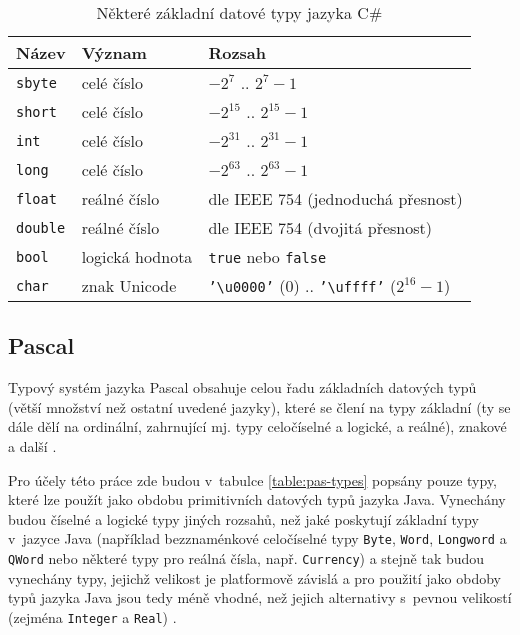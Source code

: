 \documentclass[onepage, a4paper, 12pt]{bakalarka}
\begin{document}
\begin{table}\centering
\caption{Některé základní datové typy jazyka C\#}
\begin{tabular}{| l | l | l |}
\hline
\textbf{Název} & \textbf{Význam} & \textbf{Rozsah} \\ \hline
\texttt{sbyte} & celé číslo & $-2^7$ .. $2^7-1$ \\ \hline
\texttt{short} & celé číslo & $-2^{15}$ .. $2^{15}-1$ \\ \hline
\texttt{int} & celé číslo & $-2^{31}$ .. $2^{31}-1$ \\ \hline
\texttt{long} & celé číslo & $-2^{63}$ .. $2^{63}-1$ \\ \hline
\texttt{float} & reálné číslo & dle IEEE 754 (jednoduchá přesnost) \\ \hline
\texttt{double} & reálné číslo & dle IEEE 754 (dvojitá přesnost) \\ \hline
\texttt{bool} & logická hodnota & \texttt{true} nebo \texttt{false} \\ \hline
\texttt{char} & znak Unicode & \texttt{'\textbackslash u0000'} ($0$) .. \texttt{'\textbackslash uffff'} ($2^{16} - 1$) \\ \hline
\end{tabular}
\label{table:cs-types}
\end{table}

\subsection{Pascal}
Typový systém jazyka Pascal obsahuje celou řadu základních datových typů (větší množství než ostatní uvedené jazyky), které se člení na typy základní (ty se dále dělí na ordinální, zahrnující mj. typy celočíselné a logické, a reálné), znakové a další \cite{pas-guide-types, pas-guide-base-types, pas-guide-character-types}.

Pro účely této práce zde budou v~tabulce \ref{table:pas-types} popsány pouze typy, které lze použít jako obdobu primitivních datových typů jazyka Java. Vynechány budou číselné a logické typy jiných rozsahů, než jaké poskytují základní typy v~jazyce Java (například bezznaménkové celočíselné typy \texttt{Byte}, \texttt{Word}, \texttt{Longword} a \texttt{QWord} nebo některé typy pro reálná čísla, např. \texttt{Currency}) a stejně tak budou vynechány typy, jejichž velikost je platformově závislá a pro použití jako obdoby typů jazyka Java jsou tedy méně vhodné, než jejich alternativy s~pevnou velikostí (zejména \texttt{Integer} a \texttt{Real}) \cite{pas-guide-types, pas-guide-integer, pas-guide-boolean, pas-guide-real}.\par
\end{document}
